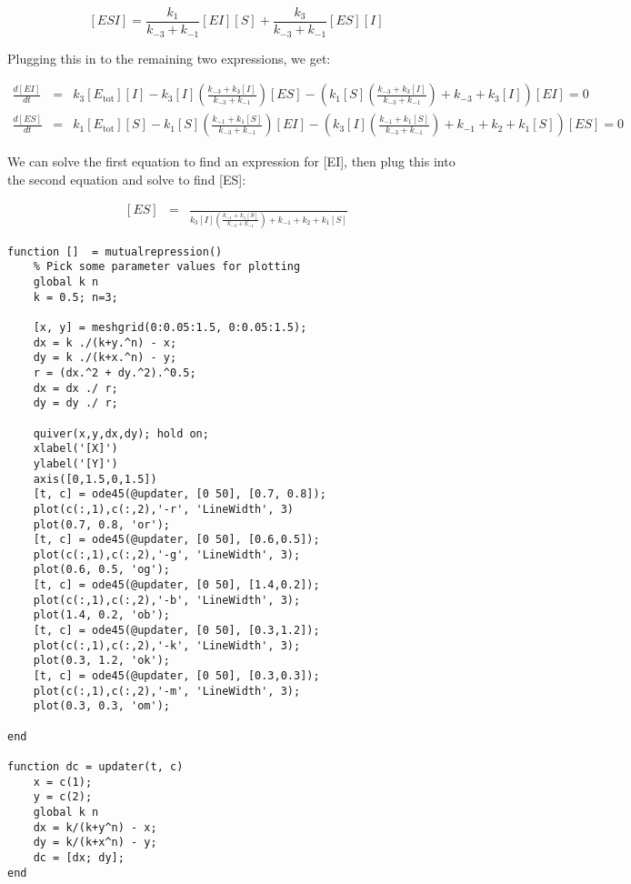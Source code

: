 \documentclass{article}
\begin{document}
\[ \left[ ESI \right] = \frac{k_{1}}{k_{-3} + k_{-1}} \left[ EI \right] \left[ S \right]  + \frac{k_{3}}{k_{-3} + k_{-1}} \left[ ES \right] \left[ I \right] \]

Plugging this in to the remaining two expressions, we get:

\begin{eqnarray*}
\frac{d\left[ EI \right]}{dt} & = & k_{3} \left[ E_{\textrm{tot}} \right] \left[ I\right]  - k_{3} \left[ I\right]  \left( \frac{k_{-3} + k_3 \left[ I \right]}{k_{-3} + k_{-1} } \right) \left[ ES \right]  - \left( k_1 \left[ S \right] \left( \frac{k_{-3} + k_3 \left[ I \right]}{k_{-3} + k_{-1} } \right) + k_{-3} + k_3 \left[ I \right] \right) \left[ EI \right] = 0 \\
\frac{d\left[ ES \right]}{dt} & = & k_{1} \left[ E_{\textrm{tot}} \right] \left[ S \right] 
- k_{1} \left[ S \right]  \left( \frac{k_{-1} + k_1 \left[ S \right]}{k_{-3} + k_{-1} } \right) \left[ EI \right] - \left( k_3 \left[ I \right] \left( \frac{k_{-1} + k_1 \left[ S \right]}{k_{-3} + k_{-1} } \right) + k_{-1} + k_2 + k_1 \left[S\right] \right) \left[ ES \right] = 0
\end{eqnarray*}

We can solve the first equation to find an expression for [EI], then plug this into the second equation and solve to find [ES]:

\begin{eqnarray*}
\left[ ES \right] & = & \frac{}{k_3 \left[ I \right] \left( \frac{k_{-1} + k_1 \left[ S \right]}{k_{-3} + k_{-1} } \right) + k_{-1} + k_2 + k_1 \left[S\right]}

\end{eqnarray*}


\begin{lstlisting}
function []  = mutualrepression()
    % Pick some parameter values for plotting
    global k n
    k = 0.5; n=3;
    
    [x, y] = meshgrid(0:0.05:1.5, 0:0.05:1.5);
    dx = k ./(k+y.^n) - x;
    dy = k ./(k+x.^n) - y;
    r = (dx.^2 + dy.^2).^0.5;
    dx = dx ./ r;
    dy = dy ./ r;
    
    quiver(x,y,dx,dy); hold on;
    xlabel('[X]')
    ylabel('[Y]')
    axis([0,1.5,0,1.5])
    [t, c] = ode45(@updater, [0 50], [0.7, 0.8]);
    plot(c(:,1),c(:,2),'-r', 'LineWidth', 3)
    plot(0.7, 0.8, 'or');
    [t, c] = ode45(@updater, [0 50], [0.6,0.5]);
    plot(c(:,1),c(:,2),'-g', 'LineWidth', 3);
    plot(0.6, 0.5, 'og');
    [t, c] = ode45(@updater, [0 50], [1.4,0.2]);
    plot(c(:,1),c(:,2),'-b', 'LineWidth', 3);
    plot(1.4, 0.2, 'ob');
    [t, c] = ode45(@updater, [0 50], [0.3,1.2]);
    plot(c(:,1),c(:,2),'-k', 'LineWidth', 3);
    plot(0.3, 1.2, 'ok');
    [t, c] = ode45(@updater, [0 50], [0.3,0.3]);
    plot(c(:,1),c(:,2),'-m', 'LineWidth', 3);
    plot(0.3, 0.3, 'om');
      
end

function dc = updater(t, c)
    x = c(1);
    y = c(2);
    global k n
    dx = k/(k+y^n) - x;
    dy = k/(k+x^n) - y;
    dc = [dx; dy];
end
\end{lstlisting}
\end{document}
